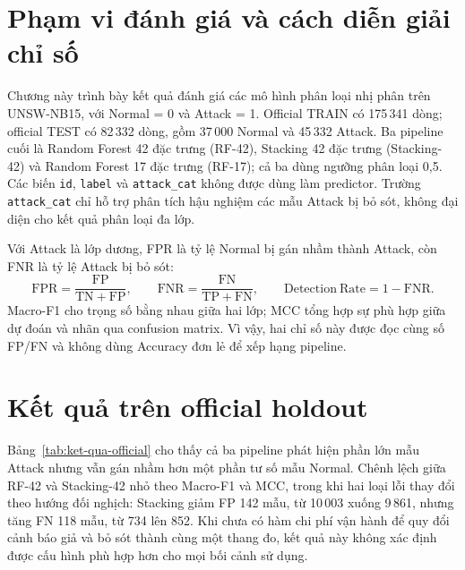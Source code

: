 \section{Phạm vi đánh giá và cách diễn giải chỉ số}
\label{sec:pham-vi-ket-qua}

Chương này trình bày kết quả đánh giá các mô hình phân loại nhị phân trên UNSW-NB15, với Normal = 0 và Attack = 1. Official TRAIN có 175\,341 dòng; official TEST có 82\,332 dòng, gồm 37\,000 Normal và 45\,332 Attack. Ba pipeline cuối là Random Forest 42 đặc trưng (RF-42), Stacking 42 đặc trưng (Stacking-42) và Random Forest 17 đặc trưng (RF-17); cả ba dùng ngưỡng phân loại 0,5. Các biến \texttt{id}, \texttt{label} và \texttt{attack\_cat} không được dùng làm predictor. Trường \texttt{attack\_cat} chỉ hỗ trợ phân tích hậu nghiệm các mẫu Attack bị bỏ sót, không đại diện cho kết quả phân loại đa lớp.

Với Attack là lớp dương, FPR là tỷ lệ Normal bị gán nhầm thành Attack, còn FNR là tỷ lệ Attack bị bỏ sót:
\begin{equation}
  \mathrm{FPR}=\frac{\mathrm{FP}}{\mathrm{TN}+\mathrm{FP}},
  \qquad
  \mathrm{FNR}=\frac{\mathrm{FN}}{\mathrm{TP}+\mathrm{FN}},
  \qquad
  \mathrm{Detection\ Rate}=1-\mathrm{FNR}.
\end{equation}
Macro-F1 cho trọng số bằng nhau giữa hai lớp; MCC tổng hợp sự phù hợp giữa dự đoán và nhãn qua confusion matrix. Vì vậy, hai chỉ số này được đọc cùng số FP/FN và không dùng Accuracy đơn lẻ để xếp hạng pipeline.

\section{Kết quả trên official holdout}
\label{sec:ket-qua-official}

Bảng~\ref{tab:ket-qua-official} cho thấy cả ba pipeline phát hiện phần lớn mẫu Attack nhưng vẫn gán nhầm hơn một phần tư số mẫu Normal. Chênh lệch giữa RF-42 và Stacking-42 nhỏ theo Macro-F1 và MCC, trong khi hai loại lỗi thay đổi theo hướng đối nghịch: Stacking giảm FP 142 mẫu, từ 10\,003 xuống 9\,861, nhưng tăng FN 118 mẫu, từ 734 lên 852. Khi chưa có hàm chi phí vận hành để quy đổi cảnh báo giả và bỏ sót thành cùng một thang đo, kết quả này không xác định được cấu hình phù hợp hơn cho mọi bối cảnh sử dụng.

